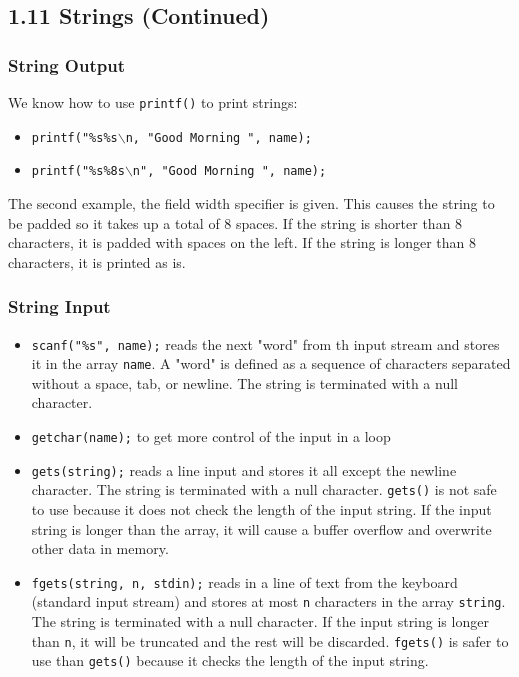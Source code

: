 \documentclass[a4paper, 10pt]{article}
\begin{document}
\pagebreak
\subsection*{1.11 Strings (Continued)}
\subsubsection{String Output}
We know how to use \texttt{printf()} to print strings:
\begin{itemize}
    \item \texttt{printf("\%s\%s$\backslash$n, "Good Morning ", name);}
    \item \texttt{printf("\%s\%8s$\backslash$n", "Good Morning ", name);}
\end{itemize}
The second example, the field width specifier is given. This causes the string to be padded so it takes up a total of 8 spaces. If the string is shorter than 8 characters, it is padded with spaces on the left. If the string is longer than 8 characters, it is printed as is.

\subsubsection{String Input}
\begin{itemize}
    \item \texttt{scanf("\%s", name);} reads the next "word" from th input stream and stores it in the array \texttt{name}. A "word" is defined as a sequence of characters separated without a space, tab, or newline. The string is terminated with a null character.
    \item \texttt{getchar(name);} to get more control of the input in a loop
    \item \texttt{gets(string);} reads a line input and stores it all except the newline character. The string is terminated with a null character. \texttt{gets()} is not safe to use because it does not check the length of the input string. If the input string is longer than the array, it will cause a buffer overflow and overwrite other data in memory.
    \item \texttt{fgets(string, n, stdin);} reads in a line of text from the keyboard (standard input stream) and stores at most \texttt{n} characters in the array \texttt{string}. The string is terminated with a null character. If the input string is longer than \texttt{n}, it will be truncated and the rest will be discarded. \texttt{fgets()} is safer to use than \texttt{gets()} because it checks the length of the input string.
\end{itemize}
\end{document}
